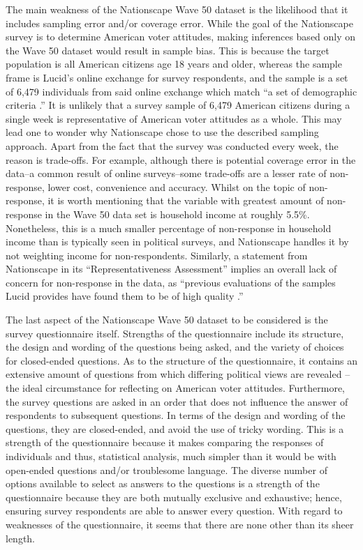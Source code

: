 \documentclass[
]{article}
\begin{document}
The main weakness of the Nationscape Wave 50 dataset is the likelihood that it includes sampling error and/or coverage error. While the goal of the Nationscape survey is to determine American voter attitudes, making inferences based only on the Wave 50 dataset would result in sample bias. This is because the target population is all American citizens age 18 years and older, whereas the sample frame is Lucid's online exchange for survey respondents, and the sample is a set of 6,479 individuals from said online exchange which match ``a set of demographic criteria \cite{tausanovitch_vavreck_reny_hayes_rudkin_2019}.'' It is unlikely that a survey sample of 6,479 American citizens during a single week is representative of American voter attitudes as a whole. This may lead one to wonder why Nationscape chose to use the described sampling approach. Apart from the fact that the survey was conducted every week, the reason is trade-offs. For example, although there is potential coverage error in the data--a common result of online surveys--some trade-offs are a lesser rate of non-response, lower cost, convenience and accuracy. Whilst on the topic of non-response, it is worth mentioning that the variable with greatest amount of non-response in the Wave 50 data set is household income at roughly 5.5\%. Nonetheless, this is a much smaller percentage of non-response in household income than is typically seen in political surveys, and Nationscape handles it by not weighting income for non-respondents. Similarly, a statement from Nationscape in its ``Representativeness Assessment'' implies an overall lack of concern for non-response in the data, as ``previous evaluations of the samples Lucid provides have found them to be of high quality \cite{tausanovitch_vavreck_reny_hayes_rudkin_2019}.''

The last aspect of the Nationscape Wave 50 dataset to be considered is the survey questionnaire itself. Strengths of the questionnaire include its structure, the design and wording of the questions being asked, and the variety of choices for closed-ended questions. As to the structure of the questionnaire, it contains an extensive amount of questions from which differing political views are revealed -- the ideal circumstance for reflecting on American voter attitudes. Furthermore, the survey questions are asked in an order that does not influence the answer of respondents to subsequent questions. In terms of the design and wording of the questions, they are closed-ended, and avoid the use of tricky wording. This is a strength of the questionnaire because it makes comparing the responses of individuals and thus, statistical analysis, much simpler than it would be with open-ended questions and/or troublesome language. The diverse number of options available to select as answers to the questions is a strength of the questionnaire because they are both mutually exclusive and exhaustive; hence, ensuring survey respondents are able to answer every question. With regard to weaknesses of the questionnaire, it seems that there are none other than its sheer length.
\end{document}
